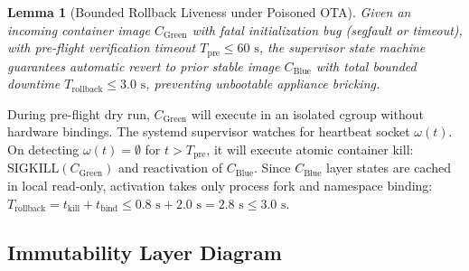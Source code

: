 \documentclass[conference]{IEEEtran}
\newtheorem{lemma}{Lemma}
\begin{document}
\begin{lemma}[Bounded Rollback Liveness under Poisoned OTA]
Given an incoming container image $C_{\mathrm{Green}}$ with fatal initialization bug (segfault or timeout), with pre-flight verification timeout $T_{\mathrm{pre}} \le 60\text{ s}$, the supervisor state machine guarantees automatic revert to prior stable image $C_{\mathrm{Blue}}$ with total bounded downtime $T_{\mathrm{rollback}} \le 3.0\text{ s}$, preventing unbootable appliance bricking.
\end{lemma}

\begin{IEEEproof}
During pre-flight dry run, $C_{\mathrm{Green}}$ will execute in an isolated cgroup without hardware bindings. The systemd supervisor watches for heartbeat socket $\omega(t)$. On detecting $\omega(t) = \emptyset$ for $t > T_{\mathrm{pre}}$, it will execute atomic container kill: $\text{SIGKILL}(C_{\mathrm{Green}})$ and reactivation of $C_{\mathrm{Blue}}$. Since $C_{\mathrm{Blue}}$ layer states are cached in local read-only, activation takes only process fork and namespace binding: $T_{\mathrm{rollback}} = t_{\mathrm{kill}} + t_{\mathrm{bind}} \le 0.8\text{ s} + 2.0\text{ s} = 2.8\text{ s} \le 3.0\text{ s}$.
\end{IEEEproof}

\subsection{Immutability Layer Diagram}
\end{document}
